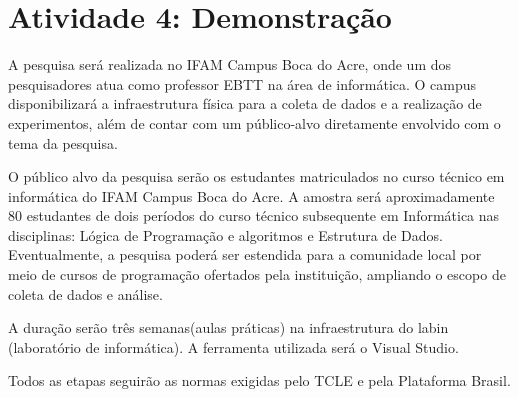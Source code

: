 \documentclass[12pt,a4paper]{article}
\begin{document}
	\section{Atividade 4: Demonstração}
	
	A pesquisa será realizada no IFAM Campus Boca do Acre, onde um dos pesquisadores atua como professor EBTT na área de informática. O campus disponibilizará a infraestrutura física para a coleta de dados e a realização de experimentos, além de contar com um público-alvo diretamente envolvido com o tema da pesquisa.
	
	O público alvo da pesquisa serão os estudantes matriculados no curso técnico em informática do IFAM Campus Boca do Acre. A amostra será aproximadamente 80 estudantes de dois períodos do curso técnico subsequente em Informática nas disciplinas: Lógica de Programação e algoritmos e Estrutura de Dados. Eventualmente, a pesquisa poderá ser estendida para a comunidade local por meio de cursos de programação ofertados pela instituição, ampliando o escopo de coleta de dados e análise.
	
	A duração serão três semanas(aulas práticas) na infraestrutura do labin (laboratório de informática). A ferramenta utilizada será o Visual Studio.
	
	Todos as etapas seguirão as normas exigidas pelo TCLE e pela Plataforma Brasil. 
\end{document}

